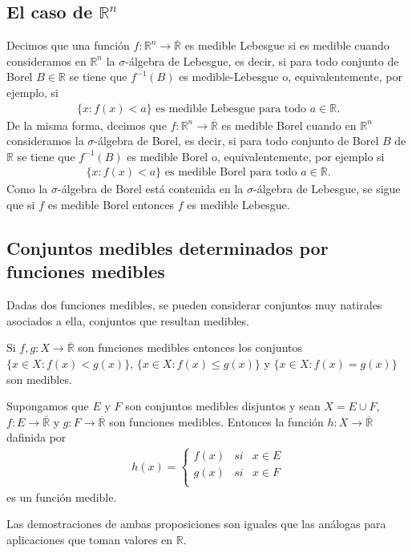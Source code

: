 \subsection{El caso de $\mathbb{R}^n$}
\begin{defi}
    Decimos que una función $f: \mathbb{R}^n \longrightarrow \overline{\mathbb{R}}$ es medible Lebesgue si es medible cuando consideramos en $\mathbb{R}^n$ la $\sigma$-álgebra de Lebesgue, es decir, si para todo conjunto de Borel $B \in \mathbb{R}$ se tiene que $f^{-1}(B)$ es medible-Lebesgue o, equivalentemente, por ejemplo, si
    \begin{align*}
        \{ x : f(x) < a \} \text{ es medible Lebesgue para todo } a \in \mathbb{R}.
    \end{align*}
    De la misma forma, dceimos que  $f: \mathbb{R}^n \longrightarrow \overline{\mathbb{R}}$ es medible Borel cuando en $\mathbb{R}^n$ consideramos la $\sigma$-álgebra de Borel, es decir, si para todo conjunto de Borel $B$ de $\mathbb{R}$ se tiene que $f^{-1}(B)$ es medible Borel o, equivalentemente, por ejemplo si
    \begin{align*}
        \{ x : f(x) < a \} \text{ es medible Borel para todo } a \in \mathbb{R}.
    \end{align*}
    Como la  $\sigma$-álgebra de Borel está contenida en la  $\sigma$-álgebra de Lebesgue, se sigue que si $f$ es medible Borel entonces $f$ es medible Lebesgue.
\end{defi}

\subsection{Conjuntos medibles determinados por funciones medibles}
Dadas dos funciones medibles, se pueden considerar conjuntos muy natirales asociados a ella, conjuntos que resultan medibles.

\begin{prop}
    Si $f,g: X \longrightarrow \overline{\mathbb{R}}$ son funciones medibles entonces los conjuntos $\{ x \in X : f(x) < g(x)\}$, $\{ x \in X : f(x) \leq g(x)\}$ y $\{ x \in X : f(x) = g(x)\}$ son medibles.
\end{prop}

\begin{prop}
    \label{prop:hmedible}
    Supongamos que $E$ y $F$ son conjuntos medibles disjuntos y sean $X = E \cup F$, $f: E \longrightarrow \overline{\mathbb{R}}$ y $g: F \longrightarrow \overline{\mathbb{R}}$ son funciones medibles. Entonces la función $h: X \longrightarrow \overline{\mathbb{R}}$ dafinida por
    \begin{align*}
        h(x) =  \left\{ \begin{array}{lcc}
                            f(x) & si & x \in E \\
                            g(x) & si & x \in F \\
                        \end{array}
        \right.
    \end{align*}
    es un función medible.
\end{prop}
Las demostraciones de ambas proposiciones son iguales que las análogas para aplicaciones que toman valores en $\mathbb{R}$.

